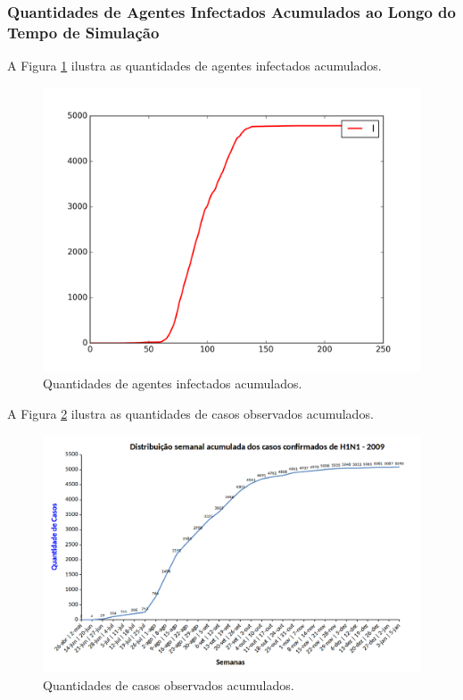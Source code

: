 \newpage

\subsubsection{Quantidades de Agentes Infectados Acumulados ao Longo do Tempo de Simulação}

A Figura \ref{fig:Quantidades_Agentes_Infectados_Acumulado_0002} ilustra as quantidades de agentes infectados acumulados.

\begin{figure}[H]
  \centering
  \includegraphics[width=1.0\textwidth]{Figuras/Resultados/0002/Saidas_GPU_BIT/MonteCarlo_0/Quantidades_Novo_Total_Acumulado_Total.png}
  \caption{Quantidades de agentes infectados acumulados.}
  \label{fig:Quantidades_Agentes_Infectados_Acumulado_0002}
\end{figure}

A Figura \ref{fig:Casos_Observados_Acumulados_0002} ilustra as quantidades de casos observados acumulados.

\begin{figure}[H]
  \centering
  \includegraphics[width=1.0\textwidth]{Figuras/Resultados/Observado/Casos_Observados_Acumulados.png}
  \caption{Quantidades de casos observados acumulados.}
  \label{fig:Casos_Observados_Acumulados_0002}
\end{figure}

